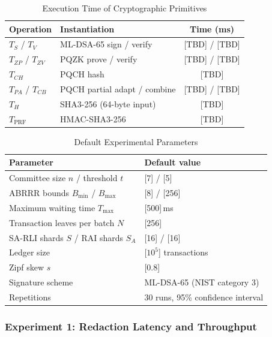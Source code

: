 \documentclass[lettersize,journal]{IEEEtran}
\begin{document}
\begin{table}[t]
\centering
\caption{Execution Time of Cryptographic Primitives}
\label{tab:primitives}
\scriptsize
\renewcommand{\arraystretch}{1.08}
\setlength{\tabcolsep}{4pt}
\begin{tabular}{llc}
\hline
\textbf{Operation} & \textbf{Instantiation} & \textbf{Time (ms)} \\
\hline
$T_S$ / $T_V$ & ML-DSA-65 sign / verify & [TBD] / [TBD] \\
$T_{ZP}$ / $T_{ZV}$ & PQZK prove / verify & [TBD] / [TBD] \\
$T_{CH}$ & PQCH hash & [TBD] \\
$T_{PA}$ / $T_{CB}$ & PQCH partial adapt / combine & [TBD] / [TBD] \\
$T_H$ & SHA3-256 (64-byte input) & [TBD] \\
$T_{\mathrm{PRF}}$ & HMAC-SHA3-256 & [TBD] \\
\hline
\end{tabular}
\end{table}

\begin{table}[t]
\centering
\caption{Default Experimental Parameters}
\label{tab:params}
\scriptsize
\renewcommand{\arraystretch}{1.08}
\setlength{\tabcolsep}{4pt}
\begin{tabular}{ll}
\hline
\textbf{Parameter} & \textbf{Default value} \\
\hline
Committee size $n$ / threshold $t$ & [7] / [5] \\
ABRRR bounds $B_{\min}$ / $B_{\max}$ & [8] / [256] \\
Maximum waiting time $T_{\max}$ & [500]\,ms \\
Transaction leaves per batch $N$ & [256] \\
SA-RLI shards $S$ / RAI shards $S_A$ & [16] / [16] \\
Ledger size & [$10^5$] transactions \\
Zipf skew $s$ & [0.8] \\
Signature scheme & ML-DSA-65 (NIST category 3) \\
Repetitions & 30 runs, 95\% confidence interval \\
\hline
\end{tabular}
\end{table}

\subsubsection*{\textbf{Experiment 1: Redaction Latency and Throughput}}
\end{document}
